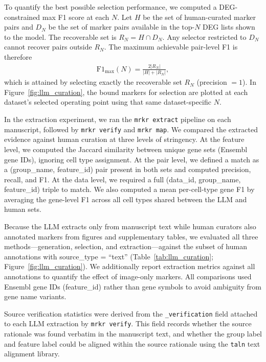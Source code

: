 \documentclass[10pt,twocolumn]{article}
\theoremstyle{plain}
\theoremstyle{definition}
\theoremstyle{remark}
\begin{document}
To quantify the best possible selection performance, we computed a DEG-constrained max F1 score at each $N$. Let $H$ be the set of human-curated marker pairs and $D_N$ be the set of marker pairs available in the top-$N$ DEG lists shown to the model. The recoverable set is $R_N = H \cap D_N$. Any selector restricted to $D_N$ cannot recover pairs outside $R_N$. The maximum achievable pair-level F1 is therefore
\begin{align}
  \mathrm{F1}_{\max}(N) = \frac{2|R_N|}{|H| + |R_N|},
\end{align}
which is attained by selecting exactly the recoverable set $R_N$ (precision $=1$). In Figure~\ref{fig:llm_curation}, the bound markers for selection are plotted at each dataset's selected operating point using that same dataset-specific $N$.

In the extraction experiment, we ran the \texttt{mrkr extract} pipeline on each manuscript, followed by \texttt{mrkr verify} and \texttt{mrkr map}. We compared the extracted evidence against human curation at three levels of stringency. At the feature level, we computed the Jaccard similarity between unique gene sets (Ensembl gene IDs), ignoring cell type assignment. At the pair level, we defined a match as a (group\_name, feature\_id) pair present in both sets and computed precision, recall, and F1. At the data level, we required a full (data\_id, group\_name, feature\_id) triple to match. We also computed a mean per-cell-type gene F1 by averaging the gene-level F1 across all cell types shared between the LLM and human sets.

Because the LLM extracts only from manuscript text while human curators also annotated markers from figures and supplementary tables, we evaluated all three methods---generation, selection, and extraction---against the subset of human annotations with source\_type = ``text'' (Table~\ref{tab:llm_curation}; Figure~\ref{fig:llm_curation}). We additionally report extraction metrics against all annotations to quantify the effect of image-only markers. All comparisons used Ensembl gene IDs (feature\_id) rather than gene symbols to avoid ambiguity from gene name variants.

Source verification statistics were derived from the \texttt{\_verification} field attached to each LLM extraction by \texttt{mrkr verify}. This field records whether the source rationale was found verbatim in the manuscript text, and whether the group label and feature label could be aligned within the source rationale using the \texttt{taln} text alignment library.
\end{document}
